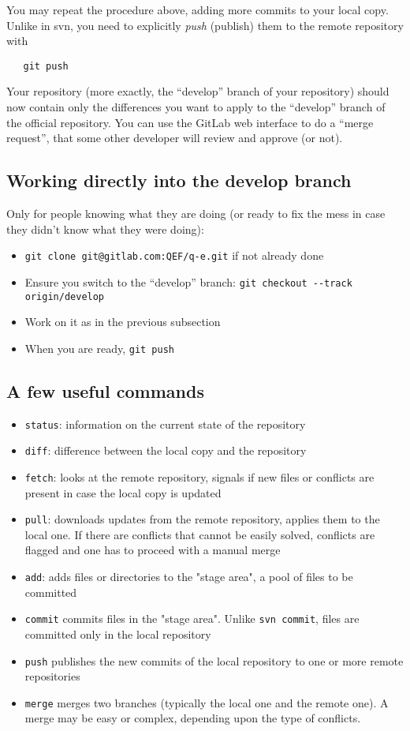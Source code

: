 \documentclass[12pt,a4paper]{article}
\begin{document}
You may repeat the procedure above, adding more commits to your local copy.
Unlike in svn, you need to explicitly {\em push} (publish) them to the remote
repository with
\begin{verbatim}
   git push
\end{verbatim}
Your repository (more exactly, the ``develop'' branch of your repository)
should now contain only the differences you want to apply to the ``develop''
branch of the official repository. You can use the GitLab web interface to
do a ``merge request'', that some other developer will review and approve
(or not).

\subsection{Working directly into the develop branch}
Only for people knowing what they are doing (or ready to fix the mess in case
they didn't know what they were doing):
\begin{itemize}
\item \verb|git clone git@gitlab.com:QEF/q-e.git| if not already done
\item Ensure you switch to the ``develop'' branch:
  \verb|git checkout --track origin/develop|
\item Work on it as in the previous subsection
\item When you are ready, \verb|git push|
\end{itemize}

\subsection{A few useful commands}
\begin{itemize}
\item \texttt{status}: information on the current state of the repository 
\item \texttt{diff}: difference between the local copy and the repository
\item  \texttt{fetch}:
  looks at the remote repository, signals if new files or conflicts are present
  in case the local copy is updated
\item  \texttt{pull}:
  downloads updates from the remote repository, applies them to the local one.
  If there are conflicts that cannot be easily solved, conflicts are flagged
  and one has to proceed with a manual merge
\item \texttt{add}: adds files or directories to the "stage area", a pool
  of files to be committed
\item \texttt{commit} commits files in the "stage area". Unlike
  \texttt{svn commit}, files are committed only in the local repository
\item \texttt{push} publishes the new commits of the local repository
  to one or more remote repositories
\item \texttt{merge} merges two branches (typically the local one and
  the remote one). A merge may be easy or complex, depending upon the type of
  conflicts.
\end{itemize}
\end{document}
